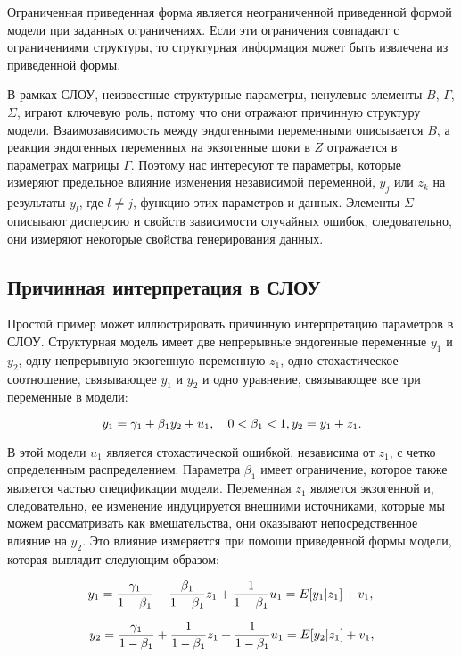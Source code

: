 	Ограниченная приведенная форма является неограниченной приведенной формой модели при заданных ограничениях. Если эти ограничения совпадают с ограничениями структуры, то структурная информация может быть извлечена из приведенной формы. 
	
	
	В рамках СЛОУ, неизвестные структурные параметры, ненулевые элементы $B$, $\Gamma$,$\Sigma$, играют ключевую роль, потому что они отражают причинную структуру модели. Взаимозависимость между эндогенными переменными описывается $B$, а реакция эндогенных переменных на экзогенные шоки в $Z$ отражается в параметрах матрицы $\Gamma$. Поэтому нас интересуют те параметры, которые измеряют предельное влияние изменения независимой переменной, $y_{j}$ или $z_{k}$ на результаты $y_{l}$, где $l\not=j$, функцию этих параметров и данных. Элементы $\Sigma$ описывают дисперсию и свойств зависимости случайных ошибок, следовательно, они измеряют некоторые свойства генерирования данных. 
	

\subsection{Причинная интерпретация в СЛОУ}


Простой пример может иллюстрировать причинную интерпретацию параметров в СЛОУ. Структурная модель имеет две непрерывные эндогенные переменные $y_{1}$ и $y_{2}$, одну непрерывную экзогенную переменную $z_{1}$, одно стохастическое соотношение, связывающее $y_{1}$ и $y_{2}$ и одно уравнение, связывающее все три переменные в модели:


\[
y_{1}=\gamma_{1}+\beta_{1}y_{2}+u_{1}, \quad 0<\beta_{1}<1, \\
y_{2}=y_{1}+z_{1}.
\]


В этой модели $u_{1}$ является стохастической ошибкой, независима от $z_{1}$, с четко определенным распределением. Параметра $\beta_{1}$ имеет ограничение, которое также является частью спецификации модели. Переменная $z_{1}$ является экзогенной и, следовательно, ее изменение индуцируется внешними источниками, которые мы можем рассматривать как вмешательства, они оказывают непосредственное влияние на $y_{2}$. Это влияние измеряется при помощи приведенной формы модели, которая выглядит следующим образом: 

\[
y_{1}=\frac{\gamma_{1}}{1-\beta_{1}}+\frac{\beta_{1}}{1-\beta_{1}}z_{1}+\frac{1}{1-\beta_{1}}u_{1} \\
= E[y_{1}|z_{1}]+v_{1}, \\
\]

\[
y_{2}=\frac{\gamma_{1}}{1-\beta_{1}}+\frac{1}{1-\beta_{1}}z_{1}+\frac{1}{1-\beta_{1}}u_{1} \\
= E[y_{2}|z_{1}]+v_{1},
\]

